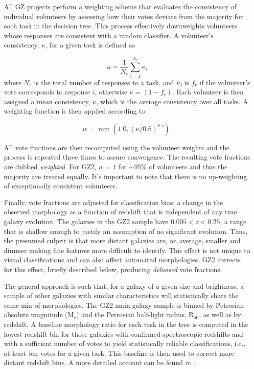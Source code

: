 All GZ projects perform a weighting scheme that evaluates the consistency of individual volunteers by assessing how their votes deviate from the majority for each task in the decision tree. This process effectively downweights volunteers whose responses are consistent with a random classifier. A volunteer's consistency, $\kappa$, for a given task is defined as 

\begin{equation}
\kappa = \frac{1}{N_r}\sum_{i=1}^{N_r}{\kappa_i}
\end{equation}
where $N_r$ is the total number of responses to a task, and $\kappa_i$ is $f_r$ if the volunteer's vote corresponds to response $i$, otherwise $\kappa=(1-f_r)$. Each volunteer is then assigned a mean consistency, $\bar\kappa$, which is the average consistency over all tasks. A weighting function is then applied according to  

\begin{equation}
w = \min({1.0, (\bar\kappa/0.6)^{8.5}}).
\end{equation}

All vote fractions are then recomputed using the volunteer weights and the process is repeated three times to assure convergence. The resulting vote fractions are dubbed \textit{weighted}. For GZ2, $w=1$ for $\sim$95\% of volunteers and thus the majority are treated equally. It's important to note that there is no up-weighting of exceptionally consistent volunteers.


Finally, vote fractions are adjusted for classification bias: a change in the observed morphology as a function of redshift that is independent of any true galaxy evolution. The galaxies in the GZ2 sample have $0.005<z<0.25$, a range that is shallow enough to justify an assumption of no significant evolution.  Thus, the presumed culprit is that more distant galaxies are, on average, smaller and dimmer making fine features more difficult to identify. This effect is not unique to visual classifications and can also affect automated morphologies. GZ2 corrects for this effect, briefly described below, producing \textit{debiased} vote fractions.

The general approach is such that, for a galaxy of a given size and brightness, a sample of other galaxies with similar characteristics will statistically share the same mix of morphologies. The GZ2 main galaxy sample is binned by Petrosian absolute magnitude (M$_r$) and the Petrosian half-light radius, R$_{50}$,  as well as by redshift. A baseline morphology ratio for each task in the tree is computed in the lowest redshift bin for those galaxies with confirmed spectroscopic redshifts and with a sufficient number of votes to yield statistically reliable classifications, i.e., at least ten votes for a given task. This baseline is then used to correct more distant redshift bins. A more detailed account can be found in \cite{Willett2013}.

